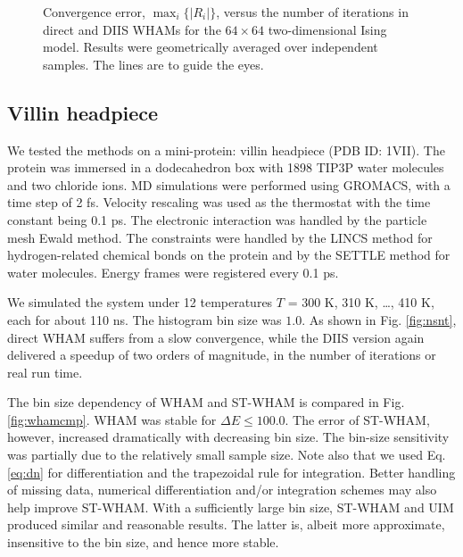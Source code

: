 \documentclass[reprint,aip,jcp,superscriptaddress]{revtex4-1}
\begin{document}
\begin{figure}[h]
  \caption{
    \label{fig:is2trace}
    Convergence error, $\max_i \{ |R_i| \}$,
    versus the number of iterations
    in direct and DIIS WHAMs
    for the $64\times64$ two-dimensional Ising model.
    Results were geometrically averaged over independent samples.
    The lines are to guide the eyes.
  }
\end{figure}





\subsection{\label{sec:results_villin}
Villin headpiece}



We tested the methods on a mini-protein:
villin headpiece\cite{duan1998}
(PDB ID: 1VII).
%
The protein was immersed in
a dodecahedron box with 1898 TIP3P water molecules and two chloride ions.
%
MD simulations were performed
using GROMACS\cite{
berendsen1995, *lindahl2001, *vanderspoel2005, *hess2008},
with a time step of 2 fs.
%
Velocity rescaling\cite{bussi2007}
was used as the thermostat with
the time constant being 0.1 ps.
%
The electronic interaction was
handled by the particle mesh Ewald method\cite{
essmann1995}.
%
The constraints were handled by the LINCS method\cite{
hess1997}
for hydrogen-related chemical bonds on the protein
and by the SETTLE method\cite{
miyamoto1992}
for water molecules.
%
Energy frames were registered every 0.1 ps.



We simulated the system under 12 temperatures
$T$ = 300 K, 310 K, \dots, 410 K,
each for about {\color{red} 110} ns.
%
The histogram bin size was $1.0$.
%
As shown in Fig. \ref{fig:nsnt},
direct WHAM suffers from a slow convergence,
while the DIIS version again
delivered a speedup of two orders of magnitude,
in the number of iterations or real run time.



The bin size dependency of WHAM and ST-WHAM
is compared in Fig. \ref{fig:whamcmp}.
%
WHAM was stable for $\Delta E \le 100.0$.
%
The error of ST-WHAM, however,
increased dramatically with decreasing bin size.
%
The bin-size sensitivity was partially due to
the relatively small sample size.
%
Note also that
we used Eq. \eqref{eq:dn} for differentiation
and the trapezoidal rule for integration.
%
Better handling of missing data,
numerical differentiation
and/or integration schemes\cite{
kim2011} may also help improve ST-WHAM.
%
With a sufficiently large bin size,
ST-WHAM and UIM produced similar and reasonable results.
%
The latter is, albeit more approximate,
insensitive to the bin size, and hence more stable.
\end{document}

